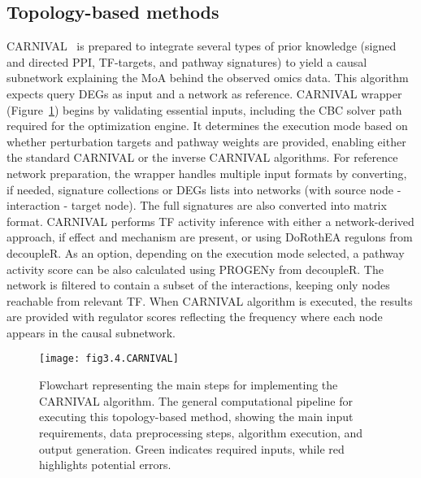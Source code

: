 \subsection{Topology-based methods} %
\label{sub:topologybasedmethods}

\gls{CARNIVAL}~\cite{RN41} is prepared to integrate several types of prior knowledge (signed and directed \gls{PPI}, \gls{TF}-targets, and pathway signatures) to yield a causal subnetwork explaining the \gls{MoA} behind the observed omics data. This algorithm expects query \gls{DEGs} as input and a network as reference. \gls{CARNIVAL} wrapper (Figure~\ref{fig:fig3.4.CARNIVAL}) begins by validating essential inputs, including the CBC solver path required for the optimization engine.
It determines the execution mode based on whether perturbation targets and pathway weights are provided, enabling either the standard \gls{CARNIVAL} or the inverse \gls{CARNIVAL} algorithms. 
For reference network preparation, the wrapper handles multiple input formats by converting, if needed, signature collections or \gls{DEGs} lists into networks (with source node - interaction - target node).
The full signatures are also converted into matrix format. \gls{CARNIVAL} performs \gls{TF} activity inference with either a network-derived approach, if effect and mechanism are present, or using DoRothEA regulons from decoupleR. 
As an option, depending on the execution mode selected, a pathway activity score can be also calculated using PROGENy from decoupleR. 
The network is filtered to contain a subset of the interactions, keeping only nodes reachable from relevant \gls{TF}.
When \gls{CARNIVAL} algorithm is executed, the results are provided with regulator scores reflecting the frequency where each node appears in the causal subnetwork.

\begin{figure}[htbp]
    \centering
    \texttt{[image: fig3.4.CARNIVAL]}
    \caption[Flowchart representing the main steps for implementing the CARNIVAL algorithm.]{Flowchart representing the main steps for implementing the \gls{CARNIVAL} algorithm. The general computational pipeline for executing this topology-based method, showing the main input requirements, data preprocessing steps, algorithm execution, and output generation. Green indicates required inputs, while red highlights potential errors.}
    \label{fig:fig3.4.CARNIVAL}
\end{figure}

